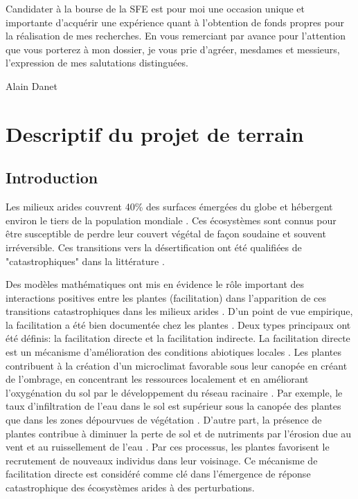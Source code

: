 \documentclass[12pt]{article} %
\begin{document}
Candidater à la bourse de la SFE est pour moi une occasion unique et importante d’acquérir une expérience quant à l’obtention de fonds propres pour la réalisation de mes recherches. En vous remerciant par avance pour l’attention que vous porterez à mon dossier, je vous prie d’agréer, mesdames et messieurs, l’expression de mes salutations distinguées.

\begin{flushright}
Alain Danet
\end{flushright}
\clearpage

\section{Descriptif du projet de terrain}

\subsection{Introduction}

Les milieux arides couvrent 40\% des surfaces émergées du globe et hébergent environ le tiers de la population mondiale \citep{Assessment2005}. Ces écosystèmes sont connus pour être susceptible de perdre leur couvert végétal de façon soudaine et souvent irréversible. Ces transitions vers la désertification ont été qualifiées de "catastrophiques" dans la littérature \citep{Scheffer2001,Kefi2007,Kefi2012a}.

Des modèles mathématiques ont mis en évidence le rôle important des interactions positives entre les plantes (facilitation) dans l'apparition de ces transitions catastrophiques dans les milieux arides \citep{Kefi2007,Kefi2007a,Rietkerk2004}. D'un point de vue empirique, la facilitation a été bien documentée chez les plantes \citep{Callaway1995, Callaway1997}. Deux types principaux ont été définis: la facilitation directe et la facilitation indirecte. La facilitation directe est un mécanisme d'amélioration des conditions abiotiques locales \citep{Kefi2007a}. Les plantes contribuent à la création d'un microclimat favorable sous leur canopée en créant de l'ombrage, en concentrant les ressources localement et en améliorant l'oxygénation du sol par le développement du réseau racinaire \citep{Rietkerk1997a}. Par exemple, le taux d'infiltration de l'eau dans le sol est supérieur sous la canopée des plantes que dans les zones dépourvues de végétation \citep{Rietkerk2000}. D'autre part, la présence de plantes contribue à diminuer la perte de sol et de nutriments par l'érosion due au vent et au ruissellement de l'eau \citep{Mayor2008}. Par ces processus, les plantes favorisent le recrutement de nouveaux individus dans leur voisinage. Ce mécanisme de facilitation directe est considéré comme clé dans l'émergence de réponse catastrophique des écosystèmes arides à des perturbations. 
\end{document}
